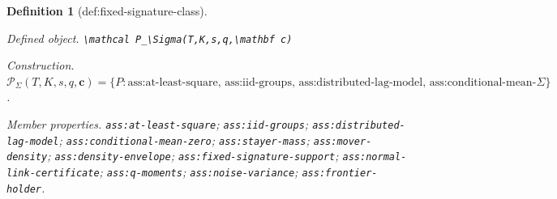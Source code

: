 \documentclass{article}
\newtheorem{definition}{Definition}
\begin{document}
\begin{definition}[def:fixed-signature-class]\label{def:fixed-signature-class}
\par\smallskip\noindent\emph{Defined object.} \texttt{\textbackslash{}\allowbreak{}mathcal P\_\allowbreak{}\textbackslash{}\allowbreak{}Sigma(T,\allowbreak{}K,\allowbreak{}s,\allowbreak{}q,\allowbreak{}\textbackslash{}\allowbreak{}mathbf c)}
\par\smallskip\noindent\emph{Construction.} \(\mathcal P_\Sigma(T,K,s,q,\mathbf c)=\{P:\text{ass:at-least-square, ass:iid-groups, ass:distributed-lag-model, ass:conditional-mean-zero, ass:stayer-mass, ass:mover-density, ass:density-envelope, ass:fixed-signature-support, ass:normal-link-certificate, ass:q-moments, ass:noise-variance, and ass:frontier-holder hold for the fixed }\Sigma\}\).
\par\smallskip\noindent\emph{Member properties.} \texttt{ass:\allowbreak{}at-\allowbreak{}least-\allowbreak{}square}; \texttt{ass:\allowbreak{}iid-\allowbreak{}groups}; \texttt{ass:\allowbreak{}distributed-\allowbreak{}lag-\allowbreak{}model}; \texttt{ass:\allowbreak{}conditional-\allowbreak{}mean-\allowbreak{}zero}; \texttt{ass:\allowbreak{}stayer-\allowbreak{}mass}; \texttt{ass:\allowbreak{}mover-\allowbreak{}density}; \texttt{ass:\allowbreak{}density-\allowbreak{}envelope}; \texttt{ass:\allowbreak{}fixed-\allowbreak{}signature-\allowbreak{}support}; \texttt{ass:\allowbreak{}normal-\allowbreak{}link-\allowbreak{}certificate}; \texttt{ass:\allowbreak{}q-\allowbreak{}moments}; \texttt{ass:\allowbreak{}noise-\allowbreak{}variance}; \texttt{ass:\allowbreak{}frontier-\allowbreak{}holder}.
\end{definition}
\end{document}
